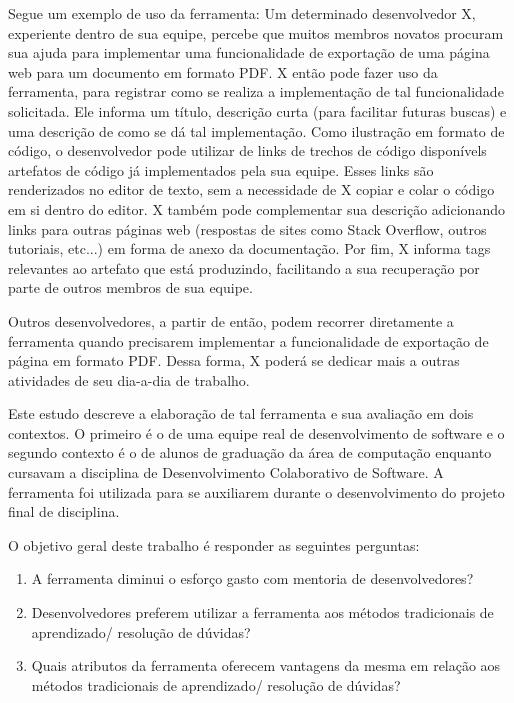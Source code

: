 Segue um exemplo de uso da ferramenta: Um determinado desenvolvedor X, experiente dentro de sua equipe, percebe que muitos membros novatos procuram sua ajuda para implementar uma funcionalidade de exportação de uma página web para um documento em formato PDF. X então pode fazer uso da ferramenta, para registrar como se realiza a implementação de tal funcionalidade solicitada. Ele informa um título, descrição curta (para facilitar futuras buscas) e uma descrição de como se dá tal implementação. Como ilustração em formato de código, o desenvolvedor pode utilizar de links de trechos de código disponívels artefatos de código já implementados pela sua equipe. Esses links são renderizados no editor de texto, sem a necessidade de X copiar e colar o código em si dentro do editor. X também pode complementar sua descrição adicionando links para outras páginas web (respostas de sites como Stack Overflow, outros tutoriais, etc...) em forma de anexo da documentação. Por fim, X informa tags relevantes ao artefato que está produzindo, facilitando a sua recuperação por parte de outros membros de sua equipe.

Outros desenvolvedores, a partir de então, podem recorrer diretamente a ferramenta quando precisarem implementar a funcionalidade de exportação de página em formato PDF. Dessa forma, X poderá se dedicar mais a outras atividades de seu dia-a-dia de trabalho.


Este estudo descreve a elaboração de tal ferramenta e sua avaliação em dois contextos. O primeiro é o de uma equipe real de desenvolvimento de software e o segundo contexto é o de alunos de graduação da área de computação enquanto cursavam a disciplina de Desenvolvimento Colaborativo de Software. A ferramenta foi utilizada para se auxiliarem durante o desenvolvimento do projeto final de disciplina.

O objetivo geral deste trabalho é responder as seguintes perguntas:

\begin{enumerate}
  \item A ferramenta diminui o esforço gasto com mentoria de desenvolvedores?
  \item Desenvolvedores preferem utilizar a ferramenta aos métodos tradicionais de aprendizado/ resolução de dúvidas?
  \item Quais atributos da ferramenta oferecem vantagens da mesma em relação aos métodos tradicionais de aprendizado/ resolução de dúvidas?
\end{enumerate}

